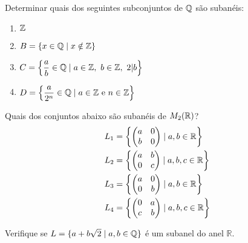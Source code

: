 \documentclass[12pt]{article}
\begin{document}
\vesp

\questao Determinar quais dos seguintes subconjuntos de $\mathbb{Q}$ s{\~a}o suban{\'e}is:
	\begin{multicols}{2}
		\begin{enumerate}[label=({\alph*})]
			\item $\mathbb{Z}$
			\item $B = \{x \in \mathbb{Q} \mid x \notin \mathbb{Z}\}$
			\item $C = \left\{\dfrac{a}{b} \in \mathbb{Q} \mid a \in \mathbb{Z},\ b \in \mathbb{Z},\ 2 |b \right\}$
			\item $D = \left\{\dfrac{a}{2^n} \in \mathbb{Q} \mid a \in \mathbb{Z} \mbox{ e } n \in \mathbb{Z} \right\}$
		\end{enumerate}
	\end{multicols}

\vesp

\questao Quais dos conjuntos abaixo s\~ao suban\'eis de $M_2(\mathbb{R})$?
\begin{align*}
	L_1 &= \left\{\begin{pmatrix}
		a & 0\\
		b & 0
	\end{pmatrix} \mid a, b \in \mathbb{R}\right\}\\
	L_2 &= \left\{\begin{pmatrix}
		a & b\\
		0 & c
	\end{pmatrix} \mid a, b, c \in \mathbb{R}\right\}\\
	L_3 &= \left\{\begin{pmatrix}
		a & 0\\
		0 & b
	\end{pmatrix} \mid a, b \in \mathbb{R}\right\}\\
	L_4 &= \left\{\begin{pmatrix}
		0 & a\\
		c & b
	\end{pmatrix} \mid a, b, c \in \mathbb{R}\right\}
\end{align*}

\vesp

\questao Verifique se $L = \{ a + b\sqrt{2} \mid a, b \in \mathbb{Q}\}$ {\'e} um subanel
do anel $\mathbb{R}$.
\end{document}
